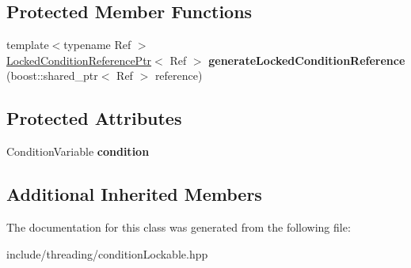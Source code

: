 \subsection*{Protected Member Functions}
\begin{DoxyCompactItemize}
\item 
\hypertarget{classcore_1_1threading_1_1_condition_lock_af3ab85b8a3d7309fad16949bd7950d1b}{{\footnotesize template$<$typename Ref $>$ }\\\hyperlink{classcore_1_1threading_1_1_locked_condition_reference_ptr}{Locked\-Condition\-Reference\-Ptr}$<$ Ref $>$ {\bfseries generate\-Locked\-Condition\-Reference} (boost\-::shared\-\_\-ptr$<$ Ref $>$ reference)}\label{classcore_1_1threading_1_1_condition_lock_af3ab85b8a3d7309fad16949bd7950d1b}

\end{DoxyCompactItemize}
\subsection*{Protected Attributes}
\begin{DoxyCompactItemize}
\item 
\hypertarget{classcore_1_1threading_1_1_condition_lock_ad068213e2de0e48476853f4c380c77e8}{Condition\-Variable {\bfseries condition}}\label{classcore_1_1threading_1_1_condition_lock_ad068213e2de0e48476853f4c380c77e8}

\end{DoxyCompactItemize}
\subsection*{Additional Inherited Members}


The documentation for this class was generated from the following file\-:\begin{DoxyCompactItemize}
\item 
include/threading/condition\-Lockable.\-hpp\end{DoxyCompactItemize}
